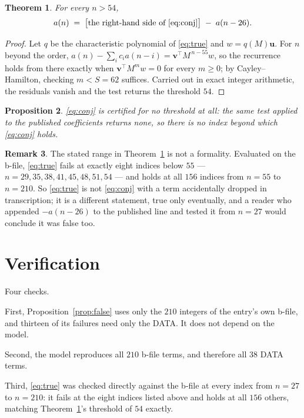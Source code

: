 \documentclass[11pt,a4paper]{article}
\theoremstyle{plain}
\newtheorem{theorem}{Theorem}
\newtheorem{proposition}[theorem]{Proposition}
\theoremstyle{definition}
\newtheorem{remark}[theorem]{Remark}
\begin{document}
\begin{theorem}\label{thm:true}
For every $n>54$,
\begin{equation}\label{eq:true}
a(n)\;=\;\bigl[\text{the right-hand side of \eqref{eq:conj}}\bigr]\;-\;a(n-26).
\end{equation}
\end{theorem}

\begin{proof}
Let $q$ be the characteristic polynomial of \eqref{eq:true} and $w=q(M)\mathbf u$. For $n$
beyond the order, $a(n)-\sum_i c_i a(n-i)=\mathbf v^{\!\top}M^{\,n-55}w$, so the recurrence
holds from there exactly when $\mathbf v^{\!\top}M^{m}w=0$ for every $m\ge0$; by
Cayley--Hamilton, checking $m<S=62$ suffices. Carried out in exact integer arithmetic, the
residuals vanish and the test returns the threshold $54$.
\end{proof}

\begin{proposition}
\eqref{eq:conj} is certified for no threshold at all: the same test applied to the published
coefficients returns none, so there is no index beyond which \eqref{eq:conj} holds.
\end{proposition}

\begin{remark}
The stated range in Theorem~\ref{thm:true} is not a formality. Evaluated on the b-file,
\eqref{eq:true} fails at exactly eight indices below $55$ ---
$n=29,35,38,41,45,48,51,54$ --- and holds at all $156$ indices from $n=55$ to $n=210$. So
\eqref{eq:true} is not \eqref{eq:conj} with a term accidentally dropped in transcription; it is
a different statement, true only eventually, and a reader who appended $-a(n-26)$ to the
published line and tested it from $n=27$ would conclude it was false too.
\end{remark}

\section{Verification}

Four checks.

First, Proposition~\ref{prop:false} uses only the $210$ integers of the entry's own b-file, and
thirteen of its failures need only the DATA. It does not depend on the model.

Second, the model reproduces all $210$ b-file terms, and therefore all $38$ DATA terms.

Third, \eqref{eq:true} was checked directly against the b-file at every index from $n=27$ to
$n=210$: it fails at the eight indices listed above and holds at all $156$ others, matching
Theorem~\ref{thm:true}'s threshold of $54$ exactly.
\end{document}
